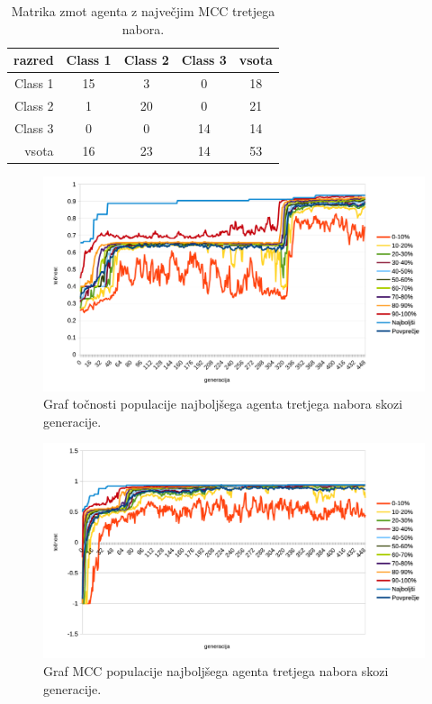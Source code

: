 \begin{table}[H]
    \centering
    \begin{tabular}{||rcccc||}
        \hline
        razred  & Class 1 & Class 2 & Class 3 & vsota \\ \hline
        Class 1 & 15      & 3       & 0       & 18    \\ \hline
        Class 2 & 1       & 20      & 0       & 21    \\ \hline
        Class 3 & 0       & 0       & 14      & 14    \\ \hline
        vsota   & 16      & 23      & 14      & 53    \\ \hline
    \end{tabular}
    \caption{Matrika zmot agenta z največjim MCC tretjega nabora.}
    \label{tab:wine_mcc_3}
\end{table}

\begin{figure}[H]
    \begin{center}
        \includegraphics[width=13cm]{wine/3/acc}
    \end{center}
    \caption{Graf točnosti populacije najboljšega agenta tretjega nabora skozi generacije.}
    \label{fig:wine_acc_3}
\end{figure}

\begin{figure}[H]
    \begin{center}
        \includegraphics[width=13cm]{wine/3/mcc}
    \end{center}
    \caption{Graf MCC populacije najboljšega agenta tretjega nabora skozi generacije.}
    \label{fig:wine_mcc_3}
\end{figure}

